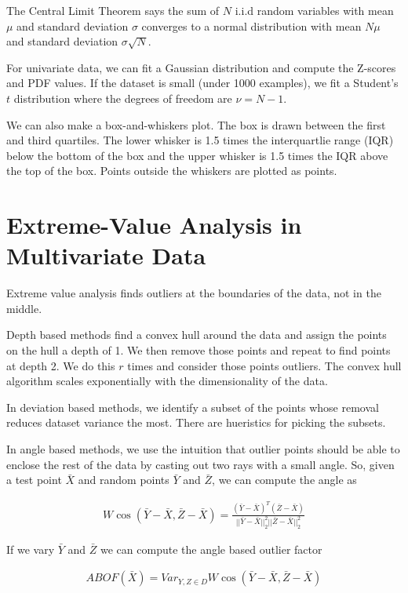 \documentclass[a4paper]{article}
\begin{document}
The Central Limit Theorem says the sum of $N$ i.i.d random variables with mean
$\mu$ and standard deviation $\sigma$ converges to a normal distribution with
mean $N \mu$ and standard deviation $\sigma \sqrt{N}$.

For univariate data, we can fit a Gaussian distribution and compute the Z-scores
and PDF values. If the dataset is small (under 1000 examples), we fit a
Student's $t$ distribution where the degrees of freedom are $\nu = N - 1$.

We can also make a box-and-whiskers plot. The box is drawn between the first
and third quartiles. The lower whisker is 1.5 times the interquartlie range
(IQR) below the bottom of the box and the upper whisker is 1.5 times the IQR
above the top of the box. Points outside the whiskers are plotted as points.

\section{Extreme-Value Analysis in Multivariate Data}
Extreme value analysis finds outliers at the boundaries of the data, not
in the middle.

Depth based methods find a convex hull around the data and assign the points
on the hull a depth of 1. We then remove those points and repeat to find points
at depth 2. We do this $r$ times and consider those points outliers. The
convex hull algorithm scales exponentially with the dimensionality of the data.

In deviation based methods, we identify a subset of the points whose removal
reduces dataset variance the most. There are hueristics for picking the
subsets.

In angle based methods, we use the intuition that outlier points should be
able to enclose the rest of the data by casting out two rays with a small angle.
So, given a test point $\bar{X}$ and random points $\bar{Y}$ and $\bar{Z}$,
we can compute the angle as

\begin{align}
  W \cos{(\bar{Y} - \bar{X}, \bar{Z} - \bar{X})}
    = \frac{(\bar{Y} - \bar{X})^T (\bar{Z} - \bar{X})}{
    ||\bar{Y} - \bar{X}||_2^2 ||\bar{Z} - \bar{X}||_2^2
    }
\end{align}

If we vary $\bar{Y}$ and $\bar{Z}$ we can compute the angle based outlier
factor

\begin{align}
  ABOF(\bar{X}) = Var_{Y, Z \in D}{W \cos{(\bar{Y} - \bar{X},
  \bar{Z} - \bar{X})}}
\end{align}
\end{document}
